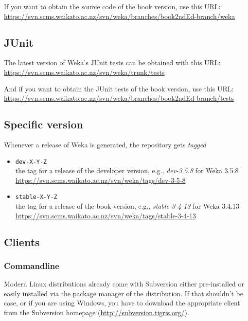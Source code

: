 \noindent If you want to obtain the source code of the book version, use this URL:\\

\url{https://svn.scms.waikato.ac.nz/svn/weka/branches/book2ndEd-branch/weka}{}\\

\subsection{JUnit}
The latest version of Weka's JUnit tests can be obtained with this URL:\\

\url{https://svn.scms.waikato.ac.nz/svn/weka/trunk/tests}{}

\noindent And if you want to obtain the JUnit tests of the book version, use this URL:\\

\url{https://svn.scms.waikato.ac.nz/svn/weka/branches/book2ndEd-branch/tests}{}

\subsection{Specific version}
Whenever a release of Weka is generated, the repository gets \textit{tagged}

\begin{itemize}
\item \verb=dev-X-Y-Z=\\the tag for a release of the developer version, e.g., \textit{dev-3.5.8} for Weka 3.5.8\\
\url{https://svn.scms.waikato.ac.nz/svn/weka/tags/dev-3-5-8}
\item \verb=stable-X-Y-Z=\\ the tag for a release of the book version, e.g., \textit{stable-3-4-13} for Weka 3.4.13\\
\url{https://svn.scms.waikato.ac.nz/svn/weka/tags/stable-3-4-13}
\end{itemize}

\subsection{Clients}
\subsubsection*{Commandline}
Modern Linux distributions already come with Subversion either
pre-installed or easily installed via the package manager of the
distribution. If that shouldn't be case, or if you are using Windows,
you have to download the appropriate client from the Subversion
homepage (\url{http://subversion.tigris.org/}{}).

